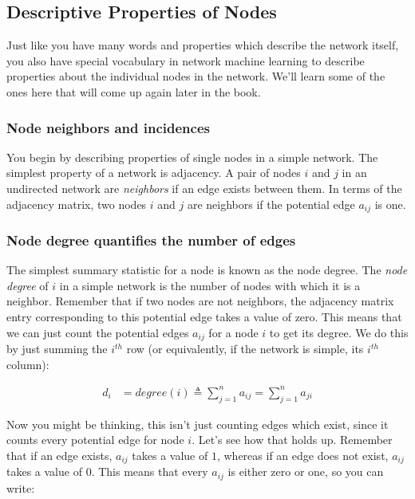 \subsection{Descriptive Properties of Nodes}

Just like you have many words and properties which describe the network itself, you also have special vocabulary in network machine learning to describe properties about the individual nodes in the network. We'll learn some of the ones here that will come up again later in the book.

\subsubsection{Node neighbors and incidences}

You begin by describing properties of single nodes in a simple network. The simplest property of a network is {adjacency}. A pair of nodes $i$ and $j$ in an undirected network are \textit{neighbors} if an edge exists between them. In terms of the adjacency matrix, two nodes $i$ and $j$ are neighbors if the potential edge $a_{ij}$ is one.

\subsubsection{Node degree quantifies the number of edges}
\label{sec:ch4:prop-net:degree}
The simplest summary statistic for a node is known as the {node degree}. The \textit{node degree} of $i$ in a simple network is the number of nodes with which it is a neighbor. Remember that if two nodes are not neighbors, the adjacency matrix entry corresponding to this {potential} edge takes a value of zero. This means that we can just count the potential edges $a_{ij}$ for a node $i$ to get its degree. We do this by just summing the $i^{th}$ row (or equivalently, if the network is simple, its $i^{th}$ column):

\begin{align}
    d_i &= degree(i) \triangleq \sum_{j = 1}^n a_{ij} = \sum_{j = 1}^n a_{ji}\label{eqn:ch4:degree}
\end{align}

Now you might be thinking, this isn't just counting edges which exist, since it counts {every} potential edge for node $i$. Let's see how that holds up. Remember that if an edge exists, $a_{ij}$ takes a value of $1$, whereas if an edge does not exist, $a_{ij}$ takes a value of $0$. This means that every $a_{ij}$ is either zero or one, so you can write:

